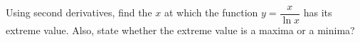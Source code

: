 
%
%
%
%
% 
% 

\question[3] Using second derivatives, find the $x$ at which the function 
$y = \dfrac{x}{\ln x}$ has its extreme value. Also, state whether the extreme 
value is a maxima or a minima? 


\ifprintanswers
\fi 

